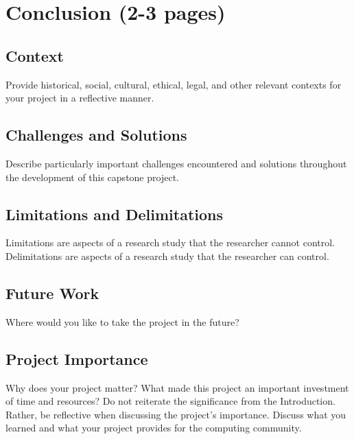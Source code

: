 \chapter{Conclusion (2-3 pages)}


\section{Context}

Provide historical, social, cultural, ethical, legal, and other relevant contexts for your project in a reflective manner.



\section{Challenges and Solutions}

Describe particularly important challenges encountered and solutions throughout the development of this capstone project.



\section{Limitations and Delimitations}

Limitations are aspects of a research study that the researcher cannot control. Delimitations are aspects of a research study that the researcher can control. 



\section{Future Work}

Where would you like to take the project in the future?


\section{Project Importance}

Why does your project matter? What made this project an important investment of time and resources? Do not reiterate the significance from the Introduction. Rather, be reflective when discussing the project’s importance. Discuss what you learned and what your project provides for the computing community.

